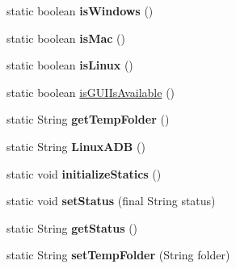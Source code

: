 \begin{DoxyCompactItemize}
\item 
\hypertarget{classCASUAL_1_1Statics_a1ae296f3d8766af35c4a66e0659c7ecb}{static boolean {\bfseries is\-Windows} ()}\label{classCASUAL_1_1Statics_a1ae296f3d8766af35c4a66e0659c7ecb}

\item 
\hypertarget{classCASUAL_1_1Statics_a24735f0291de40780e6467e6f8b9f641}{static boolean {\bfseries is\-Mac} ()}\label{classCASUAL_1_1Statics_a24735f0291de40780e6467e6f8b9f641}

\item 
\hypertarget{classCASUAL_1_1Statics_a01f5cc045ea64d46ed53ebe32124fdfb}{static boolean {\bfseries is\-Linux} ()}\label{classCASUAL_1_1Statics_a01f5cc045ea64d46ed53ebe32124fdfb}

\item 
static boolean \hyperlink{classCASUAL_1_1Statics_aae21c42970fa5c49bc669e2d55cdbdec}{is\-G\-U\-I\-Is\-Available} ()
\item 
\hypertarget{classCASUAL_1_1Statics_a0075cf7e0fd79d4e4d197f515ed3ea5a}{static String {\bfseries get\-Temp\-Folder} ()}\label{classCASUAL_1_1Statics_a0075cf7e0fd79d4e4d197f515ed3ea5a}

\item 
\hypertarget{classCASUAL_1_1Statics_abcfc580079a10ae1964c83c3cc749630}{static String {\bfseries Linux\-A\-D\-B} ()}\label{classCASUAL_1_1Statics_abcfc580079a10ae1964c83c3cc749630}

\item 
\hypertarget{classCASUAL_1_1Statics_ab514120b3acf086371e3ce18cbc8b231}{static void {\bfseries initialize\-Statics} ()}\label{classCASUAL_1_1Statics_ab514120b3acf086371e3ce18cbc8b231}

\item 
\hypertarget{classCASUAL_1_1Statics_acaa0495909e581f06e0057991b044118}{static void {\bfseries set\-Status} (final String status)}\label{classCASUAL_1_1Statics_acaa0495909e581f06e0057991b044118}

\item 
\hypertarget{classCASUAL_1_1Statics_af0238de6ce0af0549591ac2bcaf351e5}{static String {\bfseries get\-Status} ()}\label{classCASUAL_1_1Statics_af0238de6ce0af0549591ac2bcaf351e5}

\item 
\hypertarget{classCASUAL_1_1Statics_ae584e2b851a286efe9fcd6b8d4fefa05}{static String {\bfseries set\-Temp\-Folder} (String folder)}\label{classCASUAL_1_1Statics_ae584e2b851a286efe9fcd6b8d4fefa05}

\end{DoxyCompactItemize}
